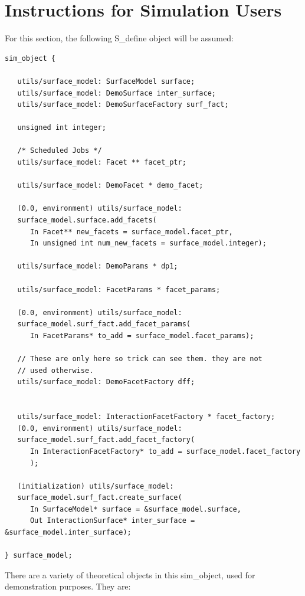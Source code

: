 \section{Instructions for Simulation Users}

For this section, the following S\_define object will be
assumed:

\begin{verbatim}
sim_object { 

   utils/surface_model: SurfaceModel surface;
   utils/surface_model: DemoSurface inter_surface;
   utils/surface_model: DemoSurfaceFactory surf_fact;

   unsigned int integer;

   /* Scheduled Jobs */
   utils/surface_model: Facet ** facet_ptr;

   utils/surface_model: DemoFacet * demo_facet;

   (0.0, environment) utils/surface_model:
   surface_model.surface.add_facets(
      In Facet** new_facets = surface_model.facet_ptr,
      In unsigned int num_new_facets = surface_model.integer);

   utils/surface_model: DemoParams * dp1;

   utils/surface_model: FacetParams * facet_params;

   (0.0, environment) utils/surface_model:
   surface_model.surf_fact.add_facet_params(
      In FacetParams* to_add = surface_model.facet_params);

   // These are only here so trick can see them. they are not
   // used otherwise.
   utils/surface_model: DemoFacetFactory dff;


   utils/surface_model: InteractionFacetFactory * facet_factory;
   (0.0, environment) utils/surface_model:
   surface_model.surf_fact.add_facet_factory(
      In InteractionFacetFactory* to_add = surface_model.facet_factory
      );

   (initialization) utils/surface_model:
   surface_model.surf_fact.create_surface(
      In SurfaceModel* surface = &surface_model.surface,
      Out InteractionSurface* inter_surface = &surface_model.inter_surface);

} surface_model;
\end{verbatim}

There are a variety of theoretical objects in this sim\_object, used
for demonstration purposes. They are:


